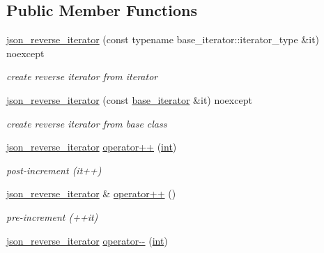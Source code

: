 \subsection*{Public Member Functions}
\begin{DoxyCompactItemize}
\item 
\hyperlink{classnlohmann_1_1basic__json_1_1json__reverse__iterator_a86c97bbb8ebe19aef4656cf796e30e99}{json\+\_\+reverse\+\_\+iterator} (const typename base\+\_\+iterator\+::iterator\+\_\+type \&it) noexcept
\begin{DoxyCompactList}\small\item\em create reverse iterator from iterator \end{DoxyCompactList}\item 
\hyperlink{classnlohmann_1_1basic__json_1_1json__reverse__iterator_a530f042e2ab1c83dddfc344931b0375a}{json\+\_\+reverse\+\_\+iterator} (const \hyperlink{classnlohmann_1_1basic__json_1_1json__reverse__iterator_a9ebc4c99e6fc90c965af0f39ad2ca70e}{base\+\_\+iterator} \&it) noexcept
\begin{DoxyCompactList}\small\item\em create reverse iterator from base class \end{DoxyCompactList}\item 
\hyperlink{classnlohmann_1_1basic__json_1_1json__reverse__iterator}{json\+\_\+reverse\+\_\+iterator} \hyperlink{classnlohmann_1_1basic__json_1_1json__reverse__iterator_a545a8204cfd6836eb85abc3113a0bb28}{operator++} (\hyperlink{tk_8h_a83f82f76e7fed06f4c49d2db94028a6d}{int})
\begin{DoxyCompactList}\small\item\em post-\/increment (it++) \end{DoxyCompactList}\item 
\hyperlink{classnlohmann_1_1basic__json_1_1json__reverse__iterator}{json\+\_\+reverse\+\_\+iterator} \& \hyperlink{classnlohmann_1_1basic__json_1_1json__reverse__iterator_a4aede52d6ee253a510897518b59e09c0}{operator++} ()
\begin{DoxyCompactList}\small\item\em pre-\/increment (++it) \end{DoxyCompactList}\item 
\hyperlink{classnlohmann_1_1basic__json_1_1json__reverse__iterator}{json\+\_\+reverse\+\_\+iterator} \hyperlink{classnlohmann_1_1basic__json_1_1json__reverse__iterator_a693439bffe56a9a8cf53bc4a06b911ff}{operator-\/-\/} (\hyperlink{tk_8h_a83f82f76e7fed06f4c49d2db94028a6d}{int})

\end{DoxyCompactItemize}
